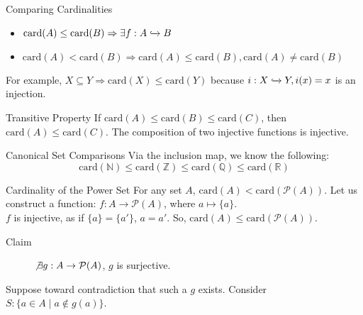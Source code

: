 \documentclass[8pt]{extarticle}
\begin{document}
  \begin{problem}{Comparing Cardinalities}
    \begin{itemize}
      \item $\textrm{card}(A) \leq \text{card}(B) \Rightarrow \exists f: A\xhookrightarrow{} B$ 
      \item $\text{card}(A) < \text{card}(B) \Rightarrow \text{card}(A) \leq \text{card}(B), \text{card}(A) \neq \textrm{card}(B)$
    \end{itemize}
    For example, $X\subseteq Y \Rightarrow \text{card}(X) \leq \text{card}(Y)$ because $i: X\xhookrightarrow{} Y, i(x) = x$ is an injection.\\

    \begin{problem}{Transitive Property}
      If $\text{card}(A) \leq \text{card}(B) \leq \text{card}(C)$, then $\text{card}(A) \leq \text{card}(C)$.
      \tcblower
      The composition of two injective functions is injective.
    \end{problem}
    \begin{problem}{Canonical Set Comparisons}
      Via the inclusion map, we know the following:
      \[
        \text{card}(\mathbb{N}) \leq \text{card}(\mathbb{Z}) \leq \text{card}(\mathbb{Q}) \leq \text{card}(\mathbb{R})
      \] 
    \end{problem}
    \begin{problem}{Cardinality of the Power Set}
      For any set $A$, $\text{card}(A) < \text{card}(\mathcal{P}(A))$.
      \tcblower
      Let us construct a function: $f: A \rightarrow \mathcal{P}(A)$, where $a \mapsto \{a\}$.\\

      $f$ is injective, as if $\{a\} = \{a'\}$, $a = a'$. So, $\text{card}(A) \leq \text{card}(\mathcal{P}(A))$.
      \begin{description}
        \item[Claim] $\not\exists g: A\rightarrow \mathcal{P}(A)$, $g$ is surjective.
      \end{description}
      Suppose toward contradiction that such a $g$ exists. Consider $S: \{a\in A \mid a\notin g(a)\}$.\\


\end{problem}
\end{problem}
\end{document}
